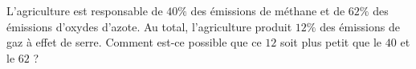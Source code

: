 
\begin{exercice}\label{exosmath-0873}

L'agriculture est responsable de \( 40\%\) des émissions de méthane et de \( 62\%\) des émissions d'oxydes d'azote. Au total, l'agriculture produit \( 12\%\) des émissions de gaz à effet de serre. Comment est-ce possible que ce \( 12\) soit plus petit que le \( 40\) et le \( 62\) ?

\end{exercice}

